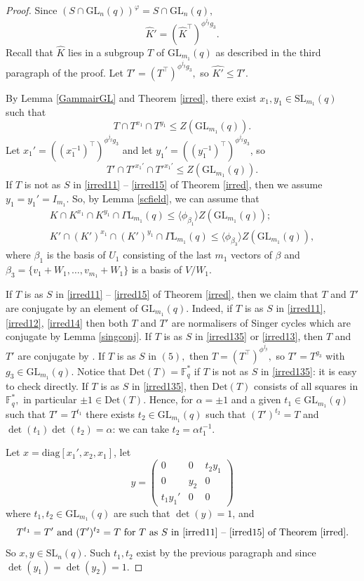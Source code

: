 \documentclass[a4paper,reqno,11pt]{amsart}
\theoremstyle{definition}
\theoremstyle{remark}
\numberwithin{equation}{section}
\newcommand{\diag}{\mathrm{diag}}
\newcommand{\Det}{\mathrm{Det}}
\newcommand{\GaL}{{\Gamma \mathrm{L}}}
\newcommand{\SL}{{\mathrm{SL}}}
\newcommand{\GL}{{\mathrm{GL}}}
\begin{document}
\begin{proof}
Since $(S \cap \GL_n(q))^{\varphi}=S \cap \GL_n(q),$  $$\hat{K}'=(\hat{K}^{\top})^{\phi^{j_g} g_3}.$$ Recall that $\hat{K}$ lies in a subgroup $T$ of $\GL_{m_1}(q)$ as described in the third paragraph of the proof.  Let $T'=(T^{\top})^{\phi^{j_g} g_3},$ so $\hat{K'}\le T'.$ 

By Lemma \ref{GammairGL} and Theorem \ref{irred}, there exist $x_1, y_1 \in \SL_{m_1}(q)$ such that $$T \cap T^{x_1} \cap T^{y_1}\le Z(\GL_{m_1}(q)).$$ Let $x_1'= ((x_1^{-1})^{\top})^{\phi^{j_g} g_3}$ and let $y_1'= ((y_1^{-1})^{\top})^{\phi^{j_g} g_3}$,  so $$T' \cap T'^{x_1'} \cap T'^{x_1'} \le Z(\GL_{m_1}(q)).$$  If $T$ is not as $S$ in  \ref{irred11} -- \ref{irred15} of Theorem \ref{irred}, then we assume $y_1=y_1'=I_{m_1}.$ So, by Lemma \ref{scfield}, we can assume that 
\begin{align*}
K \cap K^{x_1} \cap K^{y_1} \cap \GaL_{m_1}(q) \le \langle \phi_{\beta_1} \rangle Z(\GL_{m_1}(q));\\
K' \cap (K')^{x_1} \cap (K')^{y_1} \cap \GaL_{m_1}(q) \le \langle \phi_{\beta_3} \rangle Z(\GL_{m_1}(q)),
\end{align*}
 where $\beta_1$ is the basis of $U_1$ consisting of the last $m_1$ vectors of $\beta$ and $\beta_{3}=\{v_1 +W_1, \ldots, v_{m_1} + W_1\}$ is a basis of $V/W_1.$


If $T$ is as $S$ in  \ref{irred11} -- \ref{irred15} of Theorem \ref{irred}, then we claim that $T$ and $T'$ are conjugate by an element of $\GL_{m_1}(q).$ Indeed, if $T$ is as $S$ in \ref{irred11}, \ref{irred12}, \ref{irred14}  then both $T$ and $T'$ are normalisers of Singer cycles which are conjugate by Lemma \ref{singconj}. If $T$ is as $S$ in \ref{irred135} or \ref{irred13},  then $T$ and $T'$ are conjugate by \cite[\S 21, Theorem 6 $(1)$]{sup}.  If $T$ is as $S$ in  $(5),$ then $T=(T^{\top})^{\phi^{j_g}},$ so $T'=T^{g_3}$ with $g_3 \in \GL_{m_1}(q).$ Notice that $\Det(T)=\mathbb{F}_q^*$ if $T$ is not as $S$ in \ref{irred135}:  it is easy to check directly. If $T$ is as $S$ in \ref{irred135}, then $\Det(T)$ consists of all squares in $\mathbb{F}_q^*,$ in particular $\pm 1 \in \Det(T).$ Hence, for $\alpha = \pm 1$ and a given  $t_1 \in \GL_{m_1}(q)$ such that  $T'=T^{t_1}$ there exists $t_2 \in \GL_{m_1}(q)$ such that  $(T')^{t_2}=T$ and $\det(t_1)\det(t_2)=\alpha$: we can take $t_2=\alpha t_1^{-1}.$ 



Let $x= \diag[x_1', x_2, x_1]$, let 
$$y=
\begin{pmatrix}
0 & 0 & t_2 y_1 \\
0 & y_2 & 0 \\
t_1 y_1'& 0 & 0
\end{pmatrix}$$
where $t_1, t_2 \in \GL_{m_1}(q)$ are such that $\det(y)=1$, and 
$$T^{t_1}=T' \text{ and } (T')^{t_2}=T \text{ for } T \text{ as } S \text{ in \ref{irred11} -- \ref{irred15} of Theorem \ref{irred}.}$$
 So $x,y \in \SL_n(q).$ Such $t_1,t_2$ exist by the previous paragraph and since $\det(y_1)= \det(y_2)=1.$


\end{proof}
\end{document}
